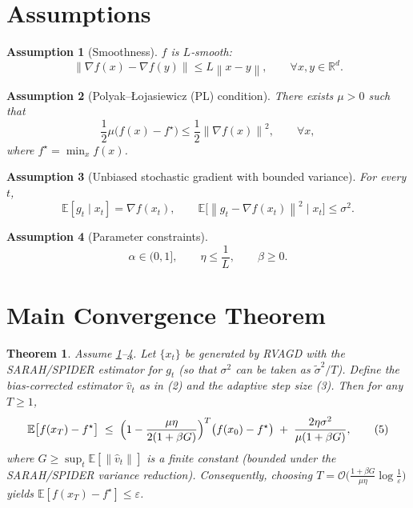 \documentclass[11pt]{article}
\newtheorem{theorem}{Theorem}
\newtheorem{assumption}{Assumption}
\newcommand{\E}{\mathbb{E}}
\newcommand{\norm}[1]{\left\lVert#1\right\rVert}
\newcommand{\grad}{\nabla}
\begin{document}
\section*{Assumptions}
\begin{assumption}[Smoothness]\label{ass:smooth}
$f$ is $L$‑smooth:
\[
\norm{\grad f(x)-\grad f(y)}\le L\norm{x-y},\qquad \forall x,y\in\mathbb{R}^d.
\]
\end{assumption}
\begin{assumption}[Polyak–Łojasiewicz (PL) condition]\label{ass:pl}
There exists $\mu>0$ such that
\[
\frac12\mu\bigl(f(x)-f^\star\bigr)\le \frac12\norm{\grad f(x)}^2,\qquad\forall x,
\]
where $f^\star=\min_x f(x)$.
\end{assumption}
\begin{assumption}[Unbiased stochastic gradient with bounded variance]\label{ass:noise}
For every $t$, 
\[
\E[g_t\mid x_t]=\grad f(x_t),\qquad 
\E\bigl[\norm{g_t-\grad f(x_t)}^2\mid x_t\bigr]\le\sigma^2.
\]
\end{assumption}
\begin{assumption}[Parameter constraints]\label{ass:params}
\[
\alpha\in(0,1],\qquad \eta\le \frac{1}{L},\qquad \beta\ge 0.
\]
\end{assumption}

\section*{Main Convergence Theorem}
\begin{theorem}\label{thm:linear}
Assume \ref{ass:smooth}–\ref{ass:params}.  Let $\{x_t\}$ be generated by RVAGD with the SARAH/SPIDER estimator for $g_t$ (so that $\sigma^2$ can be taken as $\tilde\sigma^2/T$).  Define the bias‑corrected estimator $\hat v_t$ as in (2) and the adaptive step size (3).  Then for any $T\ge 1$,
\[
\E\bigl[f(x_T)-f^\star\bigr]\;\le\;
\Bigl(1-\frac{\mu\eta}{2(1+\beta G)}\Bigr)^T\bigl(f(x_0)-f^\star\bigr)
\;+\;
\frac{2\eta\sigma^2}{\mu(1+\beta G)},
\tag{5}
\]
where $G\ge\sup_{t}\E[\norm{\hat v_t}]$ is a finite constant (bounded under the SARAH/SPIDER variance reduction).  Consequently, choosing $T= \mathcal{O}\!\bigl(\frac{1+\beta G}{\mu\eta}\log\frac{1}{\varepsilon}\bigr)$ yields $\E[f(x_T)-f^\star]\le\varepsilon$.
\end{theorem}
\end{document}
